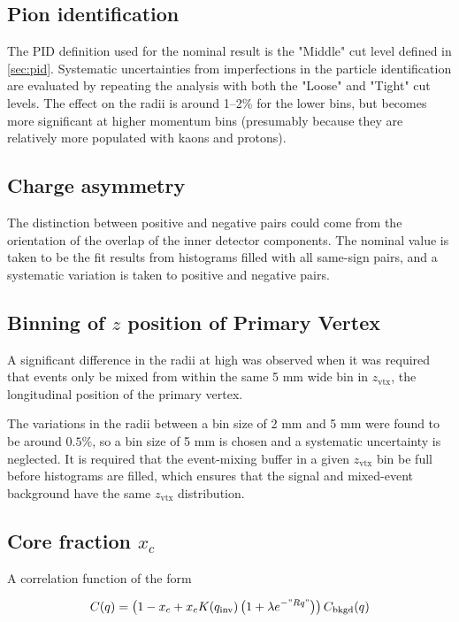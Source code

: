 \subsection{Pion identification}
The \ac{PID} definition used for the nominal result is the "Middle" cut level defined in \cref{sec:pid}.
Systematic uncertainties from imperfections in the particle identification are evaluated by repeating the analysis with both the "Loose" and "Tight" cut levels.
The effect on the radii is around 1--2\% for the lower \kt bins, but becomes more significant at higher momentum bins (presumably because they are relatively more populated with kaons and protons).

\subsection{Charge asymmetry}
The distinction between positive and negative pairs could come from the orientation of the overlap of the inner detector components.
The nominal value is taken to be the fit results from histograms filled with all same-sign pairs, and a systematic variation is taken to positive and negative pairs.

\subsection{Binning of $z$ position of Primary Vertex}
A significant difference in the radii at high \kt was observed when it was required that events only be mixed from within the same 5 mm wide bin in $z_\textrm{vtx}$, the longitudinal position of the primary vertex.

The variations in the radii between a bin size of 2 mm and 5 mm were found to be around $0.5 \%$, so a bin size of 5 mm is chosen and a systematic uncertainty is neglected.
It is required that the event-mixing buffer in a given $z_\textrm{vtx}$ bin be full before histograms are filled, which ensures that the signal and mixed-event background have the same $z_\textrm{vtx}$ distribution.

\subsection{Core fraction $x_c$}
A correlation function of the form

\begin{equation}
C(q) = \left(1-x_c + x_c K(q_{\mathrm{inv}})\left( 1 + \lambda e^{-"Rq"} \right) \right) C_{\textrm{bkgd}}(q)
\end{equation}

